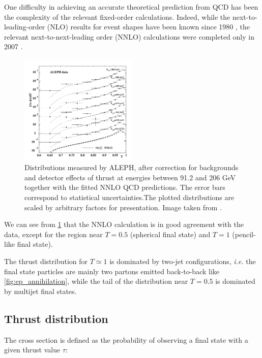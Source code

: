 \documentclass[../main.tex]{subfiles}
\begin{document}
One difficulty in achieving an accurate theoretical prediction from QCD has been the complexity of the relevant fixed-order calculations. Indeed, while the next-to-leading-order (NLO) results 
for event shapes have been known since 1980 \cite{Ellis:1980wv}, the relevant next-to-next-leading order (NNLO) calculations were completed only in 2007 \cite{Gehrmann-DeRidder:2007nzq}.

\begin{figure}[h]
    \centering
    \includegraphics[width=0.5\textwidth]{figures/LEP_Thrust_NNLO.png}
    \caption{Distributions measured by ALEPH, after correction for backgrounds and detector
    effects of thrust at energies between 91.2 and 206
    GeV together with the fitted NNLO QCD predictions. The error bars correspond to statistical
    uncertainties.The plotted
    distributions are scaled by arbitrary factors for presentation. Image taken from \cite{Dissertori_2008}.}
    \label{fig:LEP_Thrust_NNLO}
\end{figure}

We can see from \cref{fig:LEP_Thrust_NNLO} that the NNLO calculation is in good agreement with the data, except for the region near $T=0.5$ (spherical final state) and $T=1$ (pencil-like final state).

The thrust distribution for $T\simeq 1$ is dominated by two-jet configurations, \emph{i.e.} the final state particles are mainly two partons emitted back-to-back like \cref{fig:ep_annihilation}, while 
the tail of the distribution near $T= 0.5$ is dominated by multijet final states.


\subsection{Thrust distribution} \label{subsec:Thrust_distribution}

The cross section is defined as the probability of observing a final state with a given thrust value $\tau$:
\end{document}
